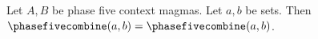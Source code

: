 

\begin{proposition}\label{phase5_grouped_structure_receiver_ambiguous}
    Let $A,B$ be phase five context magmas.
    Let $a,b$ be sets.
    Then $\phasefivecombine(a,b)=\phasefivecombine(a,b)$.
\end{proposition}

